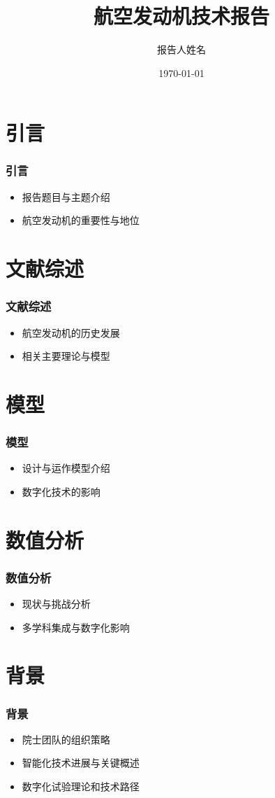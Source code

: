\documentclass{beamer}
\title{航空发动机技术报告}
\author{报告人姓名}
\institute{报告人所在机构}
\date{\today}
\begin{document}
\begin{frame}
  \titlepage
\end{frame}

\section{引言}
\begin{frame}
  \frametitle{引言}
  \begin{itemize}
    \item 报告题目与主题介绍
    \item 航空发动机的重要性与地位
  \end{itemize}
\end{frame}

\section{文献综述}
\begin{frame}
  \frametitle{文献综述}
  \begin{itemize}
    \item 航空发动机的历史发展
    \item 相关主要理论与模型
  \end{itemize}
\end{frame}

\section{模型}
\begin{frame}
  \frametitle{模型}
  \begin{itemize}
    \item 设计与运作模型介绍
    \item 数字化技术的影响
  \end{itemize}
\end{frame}

\section{数值分析}
\begin{frame}
  \frametitle{数值分析}
  \begin{itemize}
    \item 现状与挑战分析
    \item 多学科集成与数字化影响
  \end{itemize}
\end{frame}

\section{背景}
\begin{frame}
  \frametitle{背景}
  \begin{itemize}
    \item 院士团队的组织策略
    \item 智能化技术进展与关键概述
    \item 数字化试验理论和技术路径
  \end{itemize}
\end{frame}
\end{document}
